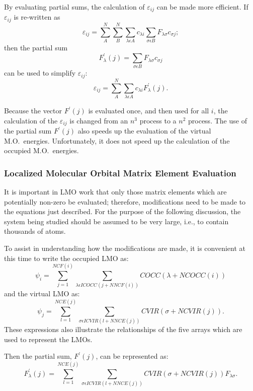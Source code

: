 By evaluating partial sums, the calculation of  $\varepsilon_{i j}$ can 
be made more efficient. If $\varepsilon_{i j}$ is re-written as
\begin{equation}
\varepsilon_{i j} = \sum_A^N\sum_B^N\sum_{\lambda\epsilon A}c_{\lambda  i}\sum_{\sigma\epsilon B}F_{\lambda \sigma}c_{\sigma  j};
\end{equation}
then the partial sum
\begin{equation}
F_{\lambda}^{'}(j) = \sum_{\sigma\epsilon B}F_{\lambda \sigma}c_{\sigma  j}
\end{equation}
can be used to simplify $\varepsilon_{i j}$:
\begin{equation}
\varepsilon_{i j} = 
\sum_A^N\sum_{\lambda\epsilon A}c_{\lambda  i}F_{\lambda}^{'}(j).
\end{equation}

Because the vector $F^{'}(j)$ is evaluated once, and then used for all $i$, the
calculation of the $\varepsilon_{i j}$ is changed from an $n^3$ process to a
$n^2$ process.  The use of the partial sum $F^{'}(j)$ also speeds up the
evaluation of the virtual M.O.\ energies.  Unfortunately, it does not speed up 
the calculation of the occupied M.O.\ energies.


\subsubsection{Localized Molecular Orbital Matrix Element Evaluation}
It is important in LMO work that only those matrix elements which are
potentially non-zero be evaluated; therefore, modifications need to be made to
the equations just described. For the purpose of the following discussion, the
system being studied should be assumed to be very large, i.e., to contain
thousands of atoms.

To assist in understanding how the modifications are made, it is convenient at
this time to write the occupied LMO as:
\begin{equation}
\psi_i = \sum_{j=1}^{NCF(i)}\sum_{\lambda\epsilon ICOCC(j+NNCF(i))}COCC(\lambda+NCOCC(i))
\end{equation}
and the virtual LMO as:
\begin{equation}
\psi_j = \sum_{l=1}^{NCE(j)}\sum_{\sigma \epsilon ICVIR(l+NNCE(j))}CVIR(\sigma 
+NCVIR(j)).\end{equation}
These expressions also illustrate the relationships of the five arrays which
are used to represent the LMOs.

Then the partial sum, $F^{'}(j)$, can be represented as:
\begin{equation}
F_{\lambda}^{'}(j) = 
\sum_{l=1}^{NCE(j)}\sum_{\sigma \epsilon ICVIR(l+NNCE(j))}CVIR(\sigma +
NCVIR(j))F_{\lambda \sigma}.
\end{equation}

